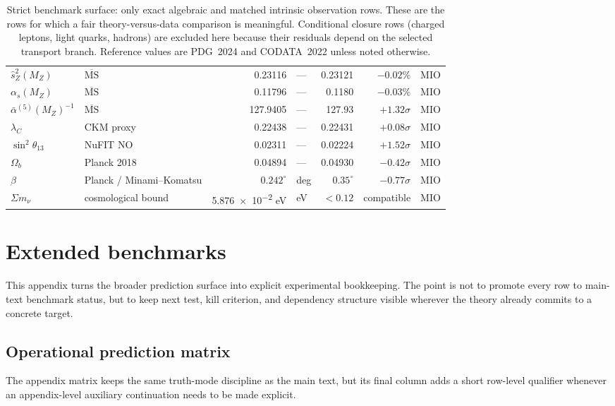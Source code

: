 \begin{table}[H]
{\begin{tabular}{@{}llrlrrl@{}}
$\hat s_Z^2(M_Z)$ & $\overline{\mathrm{MS}}$ & \num{0.23116} & --- & \num{0.23121} & $-0.02\%$ & MIO \\
$\alpha_s(M_Z)$ & $\overline{\mathrm{MS}}$ & \num{0.11796} & --- & \num{0.1180} & $-0.03\%$ & MIO \\
$\bar\alpha^{(5)}(M_Z)^{-1}$ & $\overline{\mathrm{MS}}$ & \num{127.9405} & --- & \num{127.93} & $+1.32\sigma$ & MIO \\
$\lambda_C$ & CKM proxy & \num{0.22438} & --- & \num{0.22431} & $+0.08\sigma$ & MIO \\
$\sin^2\theta_{13}$ & NuFIT NO & \num{0.02311} & --- & \num{0.02224} & $+1.52\sigma$ & MIO \\
$\Omega_b$ & Planck 2018 & \num{0.04894} & --- & \num{0.04930} & $-0.42\sigma$ & MIO \\
$\beta$ & Planck / Minami--Komatsu & $0.242^\circ$ & deg & $0.35^\circ$ & $-0.77\sigma$ & MIO \\
$\Sigma m_\nu$ & cosmological bound & \num{5.876e-2} eV & eV & $<0.12$ & compatible & MIO \\
\bottomrule
\end{tabular}}
\caption{Strict benchmark surface: only exact algebraic and matched intrinsic observation rows.
These are the rows for which a fair theory-versus-data comparison is meaningful. Conditional
closure rows (charged leptons, light quarks, hadrons) are excluded here because their residuals
depend on the selected transport branch. Reference values are PDG~2024 and CODATA~2022 unless
noted otherwise.}
\label{tab:strict-benchmark-surface}
\end{table}

\section{Extended benchmarks}
\label{app:benchmarks}

This appendix turns the broader prediction surface into explicit experimental bookkeeping. The point is not to promote every row to main-text benchmark status, but to keep next test, kill criterion, and dependency structure visible wherever the theory already commits to a concrete target.

\subsection{Operational prediction matrix}

The appendix matrix keeps the same truth-mode discipline as the main text, but its final column
adds a short row-level qualifier whenever an appendix-level auxiliary continuation needs to be
made explicit.


